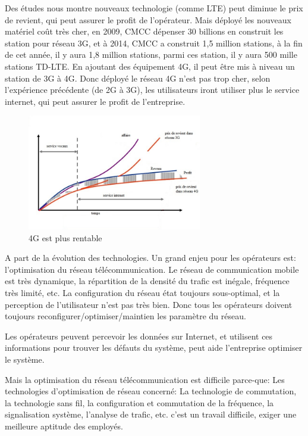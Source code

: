  Des études nous montre nouveaux technologie (comme LTE) peut diminue le prix de revient, qui peut assurer le profit de l'opérateur. Mais déployé les nouveaux matériel coût très cher, en 2009, CMCC dépenser 30 billions \textyen en construit les station pour réseau 3G, et à 2014, CMCC a construit 1,5 million stations, à la fin de cet année, il y aura 1,8 million stations, parmi ces station, il y aura 500 mille stations TD-LTE. En ajoutant des équipement 4G, il peut être mis à niveau un station de 3G à 4G. Donc déployé le réseau 4G n'est pas trop cher, selon l'expérience précédente (de 2G à 3G), les utilisateurs iront utiliser plus le service internet, qui peut assurer le profit de l'entreprise.
      \begin{figure}[H]
          \centering
          \includegraphics[width=3in]{images/why4G.jpg}
          \caption{4G est plus rentable}
          \label{why4G}
      \end{figure}
  
A part de la évolution des technologies. Un grand enjeu pour les opérateurs est: l'optimisation du réseau télécommunication. Le réseau de communication mobile est très dynamique, la répartition de la densité du trafic est inégale, fréquence très limité, etc. La configuration du réseau état toujours sous-optimal, et la perception de l'utilisateur n'est pas très bien. Donc tous les opérateurs doivent toujours reconfigurer/optimiser/maintien les paramètre du réseau.
  
Les opérateurs peuvent percevoir les données sur Internet, et utilisent ces informations pour trouver les défauts du système, peut aide l'entreprise optimiser le système.

Mais la optimisation du réseau télécommunication est difficile parce-que: Les technologies d'optimisation de réseau concerné: La technologie de commutation, la technologie sans fil, la configuration et commutation de la fréquence, la signalisation système, l'analyse de trafic, etc. c'est un travail difficile, exiger une meilleure aptitude des employés.  


